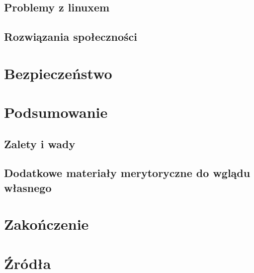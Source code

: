 \documentclass[10pt,a4paper]{report}
\begin{document}
	\section{Problemy z linuxem}
	
	\section{Rozwiązania społeczności}
	
\chapter{Bezpieczeństwo}

	
\chapter{Podsumowanie}

	\section{Zalety i wady}
	
	\section{Dodatkowe materiały merytoryczne do wglądu własnego}
	
\chapter{Zakończenie}
\newpage \newpage
\chapter{Źródła}
\end{document}
